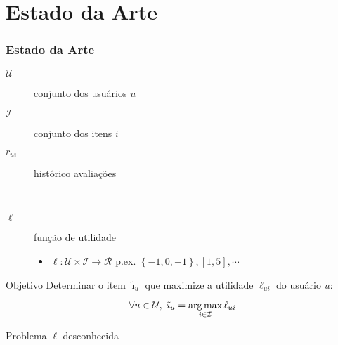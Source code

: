 \section[Estado da Arte]{Estado da Arte}
\begin{frame}
\frametitle{Estado da Arte}
\begin{description}
	\item[$\mathcal{U}$] conjunto dos usuários $u$ 
	\item[$\mathcal{I}$] conjunto dos itens $i$ 
	\item[$r_{ui}$] histórico avaliações \par{~}
	\item[$\ell$] função de utilidade 
	\begin{itemize}
		\item $\ell: \mathcal{U} \times \mathcal{I} \rightarrow \mathcal{R}$ p.ex. $\left\{-1, 0, +1\right\}, \left[1, 5\right], \cdots$
	\end{itemize}
\end{description}


\begin{block}{Objetivo}
Determinar o item $\tilde{\imath}_u$ que maximize a utilidade $\ell_{ui}$ do usuário $u$:


\begin{equation} 
\label{eq:utilidade}
\forall u \in \mathcal{U}, ~ \tilde{\imath}_u = \operatorname*{arg\,max}_{i \in \mathcal{I}}{\ell_{ui}}
\end{equation}
\end{block}

\begin{alertblock}{Problema}
$\ell$ desconhecida
\end{alertblock}
\end{frame}




